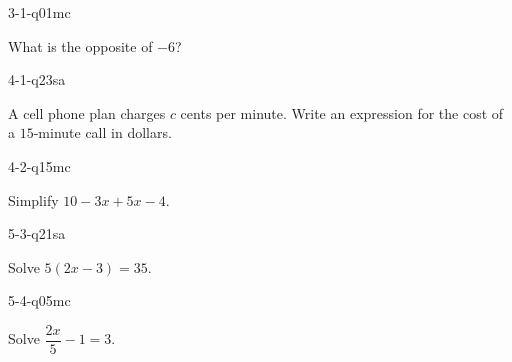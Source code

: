 \begin{practiceQuestion}{3-1-q01}{mc}
\begin{questionText}
What is the opposite of $-6$?
\end{questionText}
\end{practiceQuestion}

\begin{practiceQuestion}{4-1-q23}{sa}
\begin{questionText}
A cell phone plan charges $c$ cents per minute. Write an expression for the cost of a $15$-minute call in dollars.
\end{questionText}
\end{practiceQuestion}

\begin{practiceQuestion}{4-2-q15}{mc}
\begin{questionText}
Simplify $10 - 3x + 5x - 4$.
\end{questionText}
\end{practiceQuestion}

\begin{practiceQuestion}{5-3-q21}{sa}
\begin{questionText}
Solve $5(2x - 3) = 35$.
\end{questionText}
\end{practiceQuestion}

\begin{practiceQuestion}{5-4-q05}{mc}
\begin{questionText}
Solve $\dfrac{2x}{5} - 1 = 3$.
\end{questionText}
\end{practiceQuestion}

